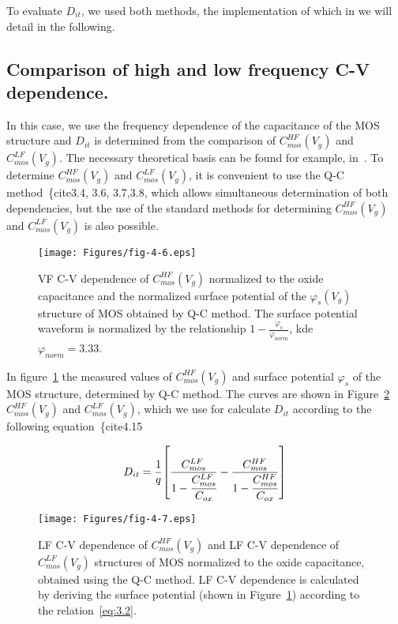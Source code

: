To evaluate $D_{it}$, we used both methods, the implementation of
which in we will detail in the following.

\subsection{Comparison of high and low frequency C-V dependence.}\label{sec:4.2.1}

In this case, we use the frequency dependence of the capacitance of
the MOS structure and $D_{it}$ is determined from the comparison of
$C_{mos}^{HF}(V_{g})$ and $C_{mos}^{LF}(V_{g})$. The necessary
theoretical basis can be found for example, in~\cite{I.1}.  To
determine $C_{mos}^{HF}(V_{g})$ and $C_{mos}^{LF}(V_{g})$, it is
convenient to use the Q-C method~\{cite{3.4, 3.6, 3.7,3.8}, which
allows simultaneous determination of both dependencies, but the use of
the standard methods for determining $C_{mos}^{HF}(V_{g})$ and
$C_{mos}^{LF}(V_{g})$ is also possible.

\begin{figure}[h!]\centering
  \texttt{[image: Figures/fig-4-6.eps]}
  \caption[VF C-V dependence of $C_{mos}^{HF}(V_{g})$ and waveform of
    the surface potential $\varphi_{s}(V_{g})$ of the MOS structure
    obtained using the Q-C method]{VF C-V dependence of
    $C_{mos}^{HF}(V_{g})$ normalized to the oxide capacitance and the
    normalized surface potential of the $\varphi_{s}(V_{g})$ structure
    of MOS obtained by Q-C method. The surface potential waveform is
    normalized by the relationship
    $1-\frac{\varphi_{s}}{\varphi_{norm}}$, kde
    $\varphi_{norm}=3.33$.}\label{fig:4.6}
\end{figure}

In figure~\ref{fig:4.6} the measured values of $C_{mos}^{HF}(V_{g})$
and surface potential $\varphi_{s}$ of the MOS structure, determined
by Q-C method. The curves are shown in Figure~\ref{fig:4.7}
$C_{mos}^{HF}(V_{g})$ and $C_{mos}^{LF}(V_{g})$, which we use for
calculate $D_{it}$ according to the following equation~\{cite{4.15}

\begin{equation}\label{eq:4.15}
  D_{it} = {\frac{1}{q}} {\left[\frac{C_{mos}^{LF}}{1-\cfrac{C_{mos}^{LF}}{C_{ox}}}-\frac{C_{mos}^{HF}}{1-\cfrac{C_{mos}^{HF}}{C_{ox}}}\right]}
\end{equation}

\begin{figure}[h!]\centering
  \texttt{[image: Figures/fig-4-7.eps]}
  \caption[VF C-V dependence $C_{mos}^{HF} (V_{g})$ and LF C-V
    dependence $C_{mos}^{LF} (V_{g})$ of the MOS structure normalized
    to the oxide capacitance, obtained using the Q-C method]{LF C-V
    dependence of $C_{mos}^{HF} (V_{g})$ and LF C-V dependence of
    $C_{mos}^{LF} (V_{g})$ structures of MOS normalized to the oxide
    capacitance, obtained using the Q-C method.  LF C-V dependence is
    calculated by deriving the surface potential (shown in
    Figure~\ref{fig:4.6}) according to the
    relation~\ref{eq:3.2}.}\label{fig:4.7}
\end{figure}

